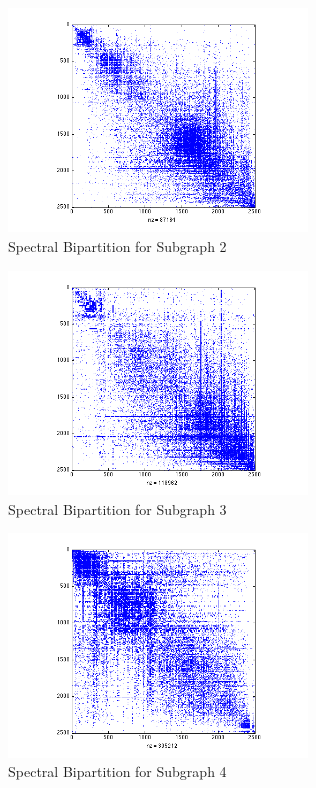 \documentclass[11pt]{article}
\begin{document}
		 \begin{figure}
		 		\begin{center}
		  		\includegraphics[width=300px]{../graphs/spectral_partition_a2.png}
		  	\end{center}
		  	\caption{Spectral Bipartition for Subgraph 2}
		  	\label{fig:sb2}
		 \end{figure}
		 
		 \begin{figure}
		 		\begin{center}
		  		\includegraphics[width=300px]{../graphs/spectral_partition_a3.png}
		  	\end{center}
		  	\caption{Spectral Bipartition for Subgraph 3}
		  	\label{fig:sb3}
		 \end{figure}
		 
		 \begin{figure}
		 		\begin{center}
		  		\includegraphics[width=300px]{../graphs/spectral_partition_a4.png}
		  	\end{center}
		  	\caption{Spectral Bipartition for Subgraph 4}
		  	\label{fig:sb4}
		 \end{figure}
		 
\end{document}
